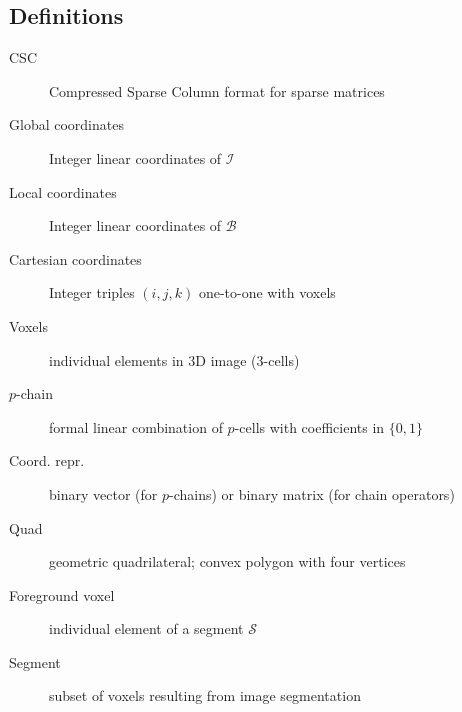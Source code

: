 \documentclass[11pt, oneside]{article}   	%
\begin{document}
\subsection{Definitions}
\begin{description}
\item[CSC]  Compressed Sparse Column format for sparse matrices
\\[-8mm]
\item[Global coordinates]  Integer linear coordinates of $\mathcal{I}$
\\[-8mm]
\item[Local coordinates] Integer linear coordinates of $\mathcal{B}$
\\[-8mm]
\item[Cartesian coordinates] Integer triples $(i,j,k)$ one-to-one with voxels 
\\[-8mm]
\item[Voxels] individual elements in 3D image (3-cells)
\\[-8mm]
\item[$p$-chain] formal linear combination of $p$-cells with coefficients in $\{0,1\}$
\\[-8mm]
\item[Coord. repr.]  binary vector (for $p$-chains) or binary matrix (for chain operators)
\\[-8mm]
\item[Quad]	geometric quadrilateral; convex polygon with four vertices 
\\[-8mm]
\item[Foreground voxel] individual element of a segment $\mathcal{S}$
\\[-8mm]
\item[Segment]	subset of voxels resulting from image segmentation
\end{description}
\end{document}
